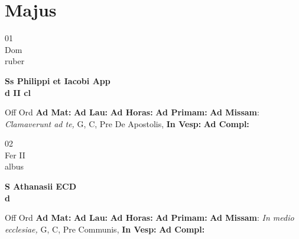 \documentclass[10pt, openany]{book}
\begin{document}
        \chapter{Majus}
                        
        \begin{center}
            \begin{minipage}{3.5in}
                \vspace{2em}
                \begin{minipage}{0.5in}
                    {\Huge 01} \\
                    {\normalsize Dom} \\
                    {\normalsize ruber}
                \end{minipage}
                \begin{minipage}{3.0in}
                    \textbf{ \large Ss Philippi et Iacobi App \\
                    \textnormal{\normalsize d II cl}} \\ 
                \end{minipage}
                \begin{justify}Off Ord
                    \textbf{Ad Mat: }
                    \textbf{Ad Lau: }
                    \textbf{Ad Horas: }
                    \textbf{Ad Primam: }\textbf{Ad Missam}: \textit{Clamaverunt ad te,} G, C, Pre De Apostolis,  
                    \textbf{In Vesp: }
                    \textbf{Ad Compl: }
                \end{justify}
            \end{minipage}
        \end{center}
    
        \begin{center}
            \begin{minipage}{3.5in}
                \vspace{2em}
                \begin{minipage}{0.5in}
                    {\Huge 02} \\
                    {\normalsize Fer II} \\
                    {\normalsize albus}
                \end{minipage}
                \begin{minipage}{3.0in}
                    \textbf{ \large S Athanasii ECD \\
                    \textnormal{\normalsize d}} \\ 
                \end{minipage}
                \begin{justify}Off Ord
                    \textbf{Ad Mat: }
                    \textbf{Ad Lau: }
                    \textbf{Ad Horas: }
                    \textbf{Ad Primam: }\textbf{Ad Missam}: \textit{In medio ecclesiae,} G, C, Pre Communis,  
                    \textbf{In Vesp: }
                    \textbf{Ad Compl: }
                \end{justify}
            \end{minipage}
        \end{center}
    
\end{document}
